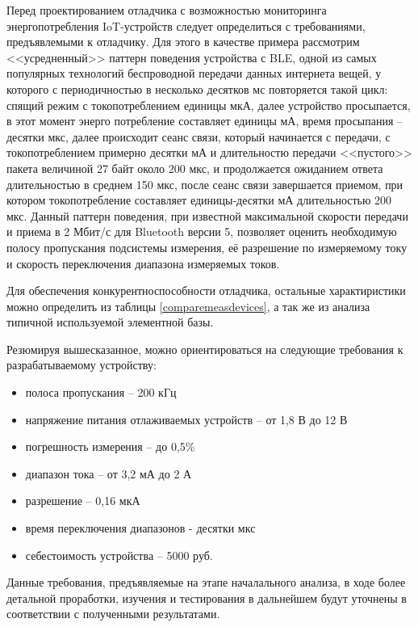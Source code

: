 Перед проектированием отладчика с возможностью мониторинга энергопотребления IoT-устройств
следует определиться с требованиями, предъявлемыми к отладчику. 
Для этого в качестве примера рассмотрим <<усредненный>> паттерн поведения устройства с BLE, одной
из самых популярных технологий беспроводной передачи данных интернета вещей, 
у которого с периодичностью в несколько десятков мс повторяется такой цикл: спящий режим 
с токопотреблением единицы мкА, далее устройство просыпается, в этот момент
энерго потребление составляет единицы мА, время просыпания -- десятки мкс, далее происходит
сеанс связи, который начинается с передачи, с токопотреблением примерно десятки мА 
и длительностю передачи <<пустого>> пакета величиной 27 байт около 200 мкс, и продолжается 
ожиданием ответа длительностью в среднем 150 мкс, после сеанс связи завершается приемом,
при котором токопотребление составляет единицы-десятки мА длительностью 200 мкс.
Данный паттерн поведения, при известной максимальной скорости передачи и приема в 2 Мбит/с для 
Bluetooth версии 5, позволяет оценить необходимую полосу пропускания подсистемы измерения,
её разрешение по измеряемому току и скорость переключения диапазона измеряемых токов. 

Для обеспечения конкурентноспособности отладчика, остальные характиристики можно определить 
из таблицы \ref{comparemeasdevices}, а так же из анализа типичной используемой элементной базы.


Резюмируя вышесказанное, можно ориентироваться на следующие требования к разрабатываемому 
устройству:
\begin{itemize}
    \item полоса пропускания -- 200 кГц
    \item напряжение питания отлаживаемых устройств -- от 1,8 В до 12 В
    \item погрешность измерения -- до 0,5\%
    \item диапазон тока -- от 3,2 мА до 2 А
    \item разрешение -- 0,16 мкА
    \item время переключения диапазонов - десятки мкс
    \item себестоимость устройства -- 5000 руб.
\end{itemize}

Данные требования, предъявляемые на этапе началального анализа, в ходе более детальной проработки,
изучения и тестирования в дальнейшем будут уточнены в соответствии с полученными результатами.
